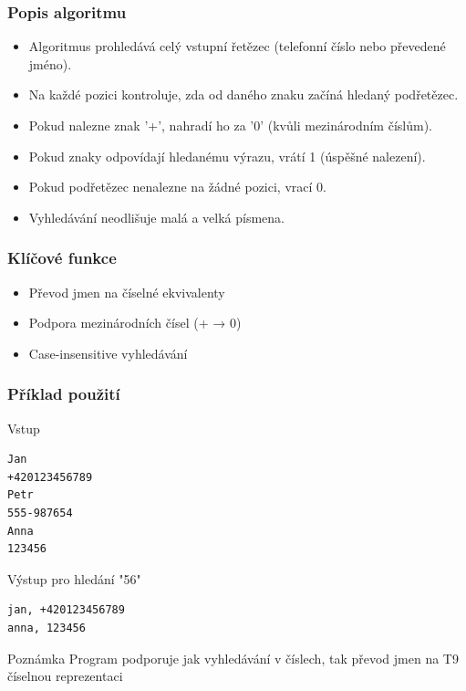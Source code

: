 \documentclass{beamer}
\begin{document}
\begin{frame}
    \frametitle{Popis algoritmu}
    \begin{itemize}
    \item Algoritmus prohledává celý vstupní řetězec (telefonní číslo nebo převedené jméno).
    \item Na každé pozici kontroluje, zda od daného znaku začíná hledaný podřetězec.
    \item Pokud nalezne znak '+', nahradí ho za '0' (kvůli mezinárodním číslům).
    \item Pokud znaky odpovídají hledanému výrazu, vrátí 1 (úspěšné nalezení).
    \item Pokud podřetězec nenalezne na žádné pozici, vrací 0.
    \item Vyhledávání neodlišuje malá a velká písmena.
    \end{itemize}
\end{frame}

\begin{frame}[fragile]
\frametitle{Klíčové funkce}
\begin{itemize}
\item Převod jmen na číselné ekvivalenty
\item Podpora mezinárodních čísel (+ → 0)
\item Case-insensitive vyhledávání
\end{itemize}
\begin{algorithm}[H]
\caption{Algoritmus pro hledání podřetězce}\label{alg:one}
\end{algorithm}
\end{frame}

\begin{frame}[fragile]
\frametitle{Příklad použití}
\begin{exampleblock}{Vstup}
\begin{lstlisting}[basicstyle=\ttfamily\small]
Jan
+420123456789
Petr
555-987654
Anna
123456
\end{lstlisting}
\end{exampleblock}

\begin{block}{Výstup pro hledání "56"}
\begin{lstlisting}[basicstyle=\ttfamily\small]
jan, +420123456789
anna, 123456
\end{lstlisting}
\end{block}

\begin{alertblock}{Poznámka}
Program podporuje jak vyhledávání v číslech, tak převod jmen na T9 číselnou reprezentaci
\end{alertblock}
\end{frame}
\end{document}

